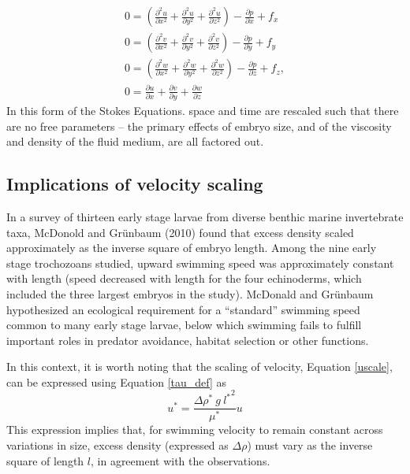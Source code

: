 \documentclass[10pt,a4paper]{article}
\def\non{\nonumber}
\def\p{\partial}
\begin{document}
\begin{eqnarray}\label{Stokes2}
	0 = \left( \frac{\p^2 u}{\p x^2}+\frac{\p^2 u}{\p y^2}+\frac{\p^2 u}{\p z^2} \right) - \frac{\p p}{\p x} + f_x \non \\
	0 = \left( \frac{\p^2 v}{\p x^2}+\frac{\p^2 v}{\p y^2}+\frac{\p^2 v}{\p z^2} \right) - \frac{\p p}{\p y} + f_y \non \\
	0 = \left( \frac{\p^2 w}{\p x^2}+\frac{\p^2 w}{\p y^2}+\frac{\p^2 w}{\p z^2} \right) - \frac{\p p}{\p z} + f_z , \non \\
	0 =  \frac{\p u}{\p {x}}+\frac{\p v}{\p {y}}+\frac{\p w}{\p {z}}
\end{eqnarray}
In this form of the Stokes Equations. space and time are rescaled such that there are no free parameters -- the primary effects of embryo size, and of the viscosity and density of the fluid medium, are all factored out.  

\subsection{Implications of velocity scaling}
In a survey of thirteen early stage larvae from diverse benthic marine invertebrate taxa, McDonold and Gr\"unbaum (2010) found that excess density scaled approximately as the inverse square of embryo length. 
Among the nine early stage trochozoans studied, upward swimming speed was approximately constant with length (speed decreased with length for the four echinoderms, which included the three largest embryos in the study).
McDonald and Gr\"unbaum hypothesized an ecological requirement for a ``standard'' swimming speed common to many early stage larvae, below which swimming fails to fulfill important roles in predator avoidance, habitat selection or other functions.

In this context, it is worth noting that the scaling of velocity, Equation \ref{uscale}, can be expressed using Equation \ref{tau_def} as
\begin{equation}\label{key}
	u^* = \frac{\Delta \rho^* ~ g ~ {l^*}^2}{\mu^*} u 
\end{equation}
This expression implies that, for swimming velocity to remain constant across variations in size, excess density (expressed as $\Delta \rho$) must vary as the inverse square of length $l$, in agreement with the observations.
\end{document}
